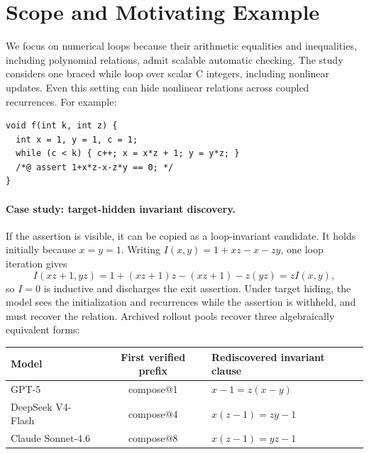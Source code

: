 


\section{Scope and Motivating Example}
\label{app:scope-example}

We focus on numerical loops because their arithmetic equalities and
inequalities, including polynomial relations, admit scalable automatic
checking.  The study considers one braced while loop over scalar C integers,
including nonlinear updates.  Even this setting can hide nonlinear relations
across coupled recurrences.  For example:
\begin{lstlisting}
void f(int k, int z) {
  int x = 1, y = 1, c = 1;
  while (c < k) { c++; x = x*z + 1; y = y*z; }
  /*@ assert 1+x*z-x-z*y == 0; */
}
\end{lstlisting}

\paragraph{Case study: target-hidden invariant discovery.}
If the assertion is visible, it can be copied as a loop-invariant candidate.
It holds initially because \(x=y=1\).  Writing
\(I(x,y)=1+xz-x-zy\), one loop iteration gives
\[
  I(xz+1,yz)
  =1+(xz+1)z-(xz+1)-z(yz)
  =zI(x,y),
\]
so \(I=0\) is inductive and discharges the exit assertion. Under target
hiding, the model sees the initialization and recurrences while the assertion
is withheld, and must recover the relation. Archived rollout pools recover
three algebraically equivalent forms:

\begin{center}
\small
\begin{tabular}{lcl}
\toprule
\rowcolor{algobg}
Model & First verified prefix & Rediscovered invariant clause \\
\midrule
GPT-5 & compose@1 & \(x-1=z(x-y)\) \\
DeepSeek V4-Flash & compose@4 & \(x(z-1)=zy-1\) \\
Claude Sonnet-4.6 & compose@8 & \(x(z-1)=yz-1\) \\
\bottomrule
\end{tabular}
\end{center}

